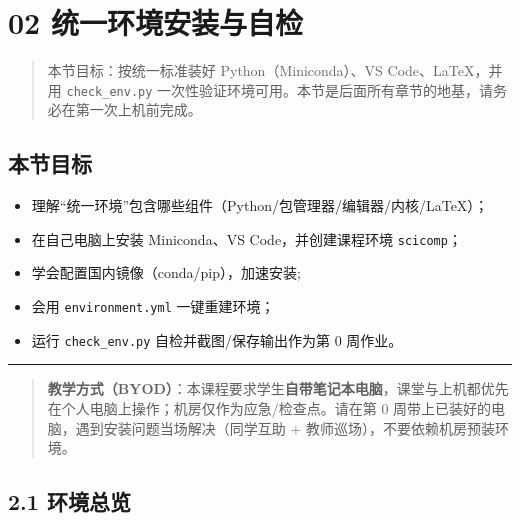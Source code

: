 \section{02
统一环境安装与自检}\label{ux7edfux4e00ux73afux5883ux5b89ux88c5ux4e0eux81eaux68c0}

\begin{quote}
本节目标：按统一标准装好 Python（Miniconda）、VS Code、LaTeX，并用
\texttt{check\_env.py}
一次性验证环境可用。本节是后面所有章节的地基，请务必在第一次上机前完成。
\end{quote}

\subsection{本节目标}\label{ux672cux8282ux76eeux6807-1}

\begin{itemize}
\tightlist
\item
  理解``统一环境''包含哪些组件（Python/包管理器/编辑器/内核/LaTeX）；
\item
  在自己电脑上安装 Miniconda、VS Code，并创建课程环境 \texttt{scicomp}；
\item
  学会配置国内镜像（conda/pip），加速安装;
\item
  会用 \texttt{environment.yml} 一键重建环境；
\item
  运行 \texttt{check\_env.py} 自检并截图/保存输出作为第 0 周作业。
\end{itemize}

\begin{center}\rule{0.5\linewidth}{0.5pt}\end{center}

\begin{quote}
\textbf{教学方式（BYOD）}：本课程要求学生\textbf{自带笔记本电脑}，课堂与上机都优先在个人电脑上操作；机房仅作为应急/检查点。请在第
0 周带上已装好的电脑，遇到安装问题当场解决（同学互助 +
教师巡场），不要依赖机房预装环境。
\end{quote}

\subsection{2.1 环境总览}\label{ux73afux5883ux603bux89c8}

